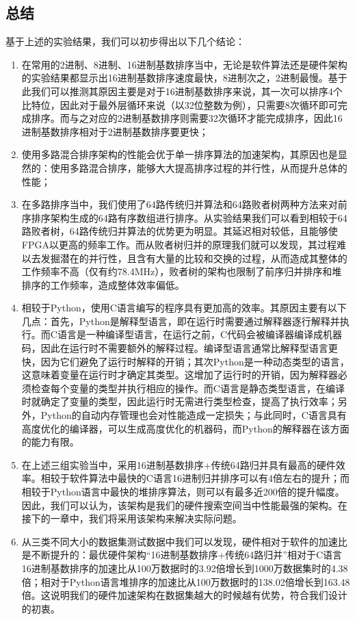 \subsection{总结}
基于上述的实验结果，我们可以初步得出以下几个结论：
\begin{enumerate}
    \item 在常用的2进制、8进制、16进制基数排序当中，无论是软件算法还是硬件架构的实验结果都显示出16进制基数排序速度最快，8进制次之，2进制最慢。基于此我们可以推测其原因主要是对于16进制基数排序来说，其一次可以排序4个比特位，因此对于最外层循环来说（以32位整数为例），只需要8次循环即可完成排序。而与之对应的2进制基数排序则需要32次循环才能完成排序，因此16进制基数排序相对于2进制基数排序要更快；
    \item 使用多路混合排序架构的性能会优于单一排序算法的加速架构，其原因也是显然的：使用多路混合排序，能够大大提高排序过程的并行性，从而提升总体的性能；
    \item 在多路排序当中，我们使用了64路传统归并算法和64路败者树两种方法来对前序排序架构生成的64路有序数组进行排序。从实验结果我们可以看到相较于64路败者树，64路传统归并算法的优势更为明显。其延迟相对较低，且能够使FPGA以更高的频率工作。而从败者树归并的原理我们就可以发现，其过程难以去发掘潜在的并行性，且含有大量的比较和交换的过程，从而造成其整体的工作频率不高（仅有约78.4MHz），败者树的架构也限制了前序归并排序和堆排序的工作频率，造成整体效率偏低。
    \item 相较于Python，使用C语言编写的程序具有更加高的效率。其原因主要有以下几点：首先，Python是解释型语言，即在运行时需要通过解释器逐行解释并执行。而C语言是一种编译型语言，在运行之前，C代码会被编译器编译成机器码，因此在运行时不需要额外的解释过程。编译型语言通常比解释型语言更快，因为它们避免了运行时解释的开销；其次Python是一种动态类型的语言，这意味着变量在运行时才确定其类型。这增加了运行时的开销，因为解释器必须检查每个变量的类型并执行相应的操作。而C语言是静态类型语言，在编译时就确定了变量的类型，因此运行时无需进行类型检查，提高了执行效率；另外，Python的自动内存管理也会对性能造成一定损失；与此同时，C语言具有高度优化的编译器，可以生成高度优化的机器码，而Python的解释器在该方面的能力有限。
    \item 在上述三组实验当中，采用16进制基数排序+传统64路归并具有最高的硬件效率。相较于软件算法中最快的C语言16进制归并排序可以有4倍左右的提升；而相较于Python语言中最快的堆排序算法，则可以有最多近200倍的提升幅度。因此，我们可以认为，该架构是我们的硬件搜索空间当中性能最强的架构。在接下的一章中，我们将采用该架构来解决实际问题。
    \item 从三类不同大小的数据集测试数据中我们可以发现，硬件相对于软件的加速比是不断提升的：最优硬件架构“16进制基数排序+传统64路归并”相对于C语言16进制基数排序的加速比从100万数据时的3.92倍增长到1000万数据集时的4.38倍；相对于Python语言堆排序的加速比从100万数据时的138.02倍增长到163.48倍。这说明我们的硬件加速架构在数据集越大的时候越有优势，符合我们设计的初衷。
\end{enumerate}


